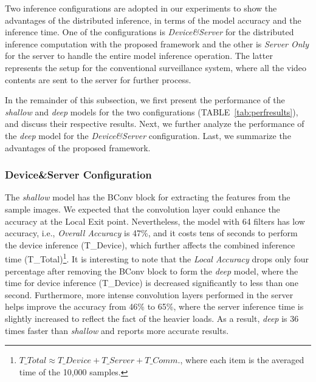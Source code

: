 \documentclass[format=acmsmall, review=false, screen=true]{acmart}
\def\tablename{TABLE}
\begin{document}
Two inference configurations are adopted in our experiments to show the advantages of the distributed inference, in terms of the model accuracy and the inference time. One of the configurations is \emph{Device\&Server} for the distributed inference computation with the proposed framework and the other is \emph{Server Only} for the server to handle the entire model inference operation. The latter represents the setup for the conventional surveillance system, where all the video contents are sent to the server for further process.

In the remainder of this subsection, we first present the performance of the \emph{shallow} and \emph{deep} models for the two configurations (\tablename~\ref{tab:perfresults}), and discuss their respective results. Next, we further analyze the performance of the \emph{deep} model for the \emph{Device\&Server} configuration. Last, we summarize the advantages of the proposed framework.

\subsubsection{Device\&Server Configuration} The \emph{shallow} model has the BConv block for extracting the features from the sample images. We expected that the convolution layer could enhance the accuracy at the Local Exit point. Nevertheless, the model with 64 filters has low accuracy, i.e., \emph{Overall Accuracy} is 47\%, and it costs tens of seconds to perform the device inference (T\_Device), which further affects the combined inference time (T\_Total)\footnote{$T\_Total \approx T\_Device  + T\_Server + T\_Comm.$, where each item is the averaged time of the 10,000 samples.}. It is interesting to note that the \emph{Local Accuracy} drops only four percentage after removing the BConv block to form the \emph{deep} model, where the time for device inference (T\_Device) is decreased significantly to less than one second. Furthermore, more intense convolution layers performed in the server helps improve the accuracy from 46\% to 65\%, where the server inference time is slightly increased to reflect the fact of the heavier loads. As a result, \emph{deep} is 36 times faster than \emph{shallow} and reports more accurate results.
\end{document}

